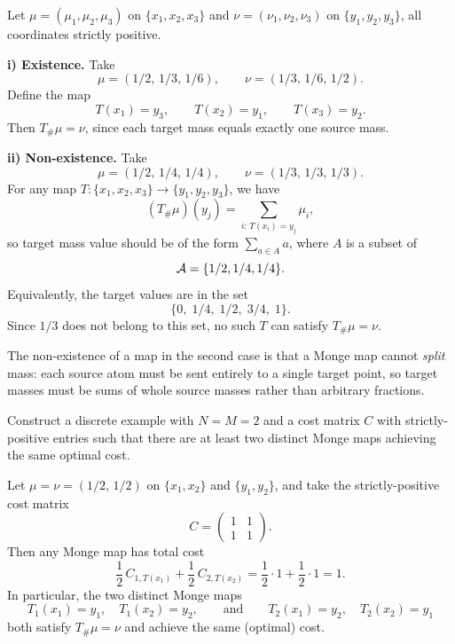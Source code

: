 \begin{solution}

Let $\mu=(\mu_1,\mu_2,\mu_3)$ on $\{x_1,x_2,x_3\}$ and 
$\nu=(\nu_1,\nu_2,\nu_3)$ on $\{y_1,y_2,y_3\}$, all coordinates strictly positive.

\medskip
\noindent\textbf{i) Existence.}
Take 
\[
\mu=(1/2,\,1/3,\,1/6),
\qquad
\nu=(1/3,\,1/6,\,1/2).
\]
Define the map
\[
T(x_1)=y_3, 
\qquad 
T(x_2)=y_1, 
\qquad 
T(x_3)=y_2.
\]
Then $T_\#\mu=\nu$, since each target mass equals exactly one source mass.

\medskip
\noindent\textbf{ii) Non-existence.}
Take 
\[
\mu=(1/2,\,1/4,\,1/4),
\qquad
\nu=(1/3,\,1/3,\,1/3).
\]
For any map $T:\{x_1,x_2,x_3\}\to\{y_1,y_2,y_3\}$, we have
\[
(T_\#\mu)(y_j)
=
\sum_{i:\,T(x_i)=y_j}\mu_i,
\]
so target mass value should be of the form $\sum_{a\in A} a$, where $A$ is a subset of 
\[
{\mathcal A} = \{1/2,1/4,1/4\}.
\]
Equivalently, the target values are in the set
\[
\{0,\;1/4,\;1/2,\;3/4,\;1\}.
\]
Since $1/3$ does not belong to this set, no such $T$ can satisfy $T_\#\mu=\nu$.

The non-existence of a map in the second case is that a Monge map cannot \emph{split} mass: each source atom must be sent entirely to a single target point, so target masses must be sums of whole source masses rather than arbitrary fractions.
\end{solution}



\begin{exercise}
Construct a discrete example with \(N=M=2\) and a cost matrix \(C\) with strictly-positive entries such that there are at
least two distinct Monge maps achieving the same optimal cost.
\end{exercise}

\begin{solution}
Let $\mu=\nu=(1/2,\,1/2)$ on $\{x_1,x_2\}$ and $\{y_1,y_2\}$, and take the strictly-positive cost matrix
\[
C=\begin{pmatrix}
1 & 1\\
1 & 1
\end{pmatrix}.
\]
Then any Monge map has total cost
\[
\frac12\,C_{1,T(x_1)}+\frac12\,C_{2,T(x_2)}=\frac12\cdot 1+\frac12\cdot 1=1.
\]
In particular, the two distinct Monge maps
\[
T_1(x_1)=y_1,\quad T_1(x_2)=y_2,
\qquad\text{and}\qquad
T_2(x_1)=y_2,\quad T_2(x_2)=y_1
\]
both satisfy $T_\#\mu=\nu$ and achieve the same (optimal) cost.
\end{solution}


